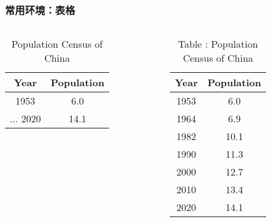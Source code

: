 \begin{frame}[fragile]
\frametitle{常用环境：表格}
\begin{columns}
\begin{column}{0.62\textwidth}
  \begin{texcode}[gobble=4, moretexcs={\toprule,\midrule,\bottomrule},
      emph={[1]table,tabular}, emph={[2]booktabs}]
    \usepackage{booktabs} %
    \begin{table}
      \caption{Population Census of China}
      \label{tab:china-population}
      \begin{tabular}{cc}
        \toprule
          Year & Population \\
        \midrule
          1953 &  6.0 \\
          ...
          2020 & 14.1 \\
        \bottomrule
      \end{tabular}
    \end{table}
  \end{texcode}
\end{column}
\pause
\begin{column}{0.3\textwidth}
  \begin{table}
    \caption{\textcolor{keyword}{Table \thetable:} Population Census of China}
    \label{tab:china-population_}
    \footnotesize
    \begin{tabular}{cc}
      \toprule
        Year & Population \\
      \midrule
        1953 &  6.0 \\
        1964 &  6.9 \\
        1982 & 10.1 \\
        1990 & 11.3 \\
        2000 & 12.7 \\
        2010 & 13.4 \\
        2020 & 14.1 \\
      \bottomrule
    \end{tabular}
  \end{table}
\end{column}
\end{columns}
\end{frame}

